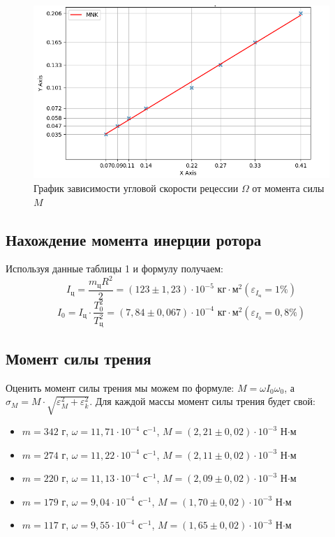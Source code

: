 \documentclass[a4paper]{article}
\begin{document}
\begin{figure}[h!]
    \centering
    \includegraphics[width=1\textwidth]{pick3}
    \caption{График зависимости угловой скорости рецессии $\Omega$ от момента силы $M$}
\end{figure}


\subsection{Нахождение момента инерции ротора}
Используя данные таблицы 1 и формулу \label{moment} получаем:
\[I_{\text{ц}} = \frac{m_{\text{ц}}R^2}{2} = (123 \pm 1,23) \cdot 10^{-5} \text{ кг}\cdot\text{м}^2 (\varepsilon_{I_{\text{ц}}} = 1\%)\]
\[I_{0} = I_{\text{ц}} \cdot \frac{T_{0}^2}{T_{\text{ц}}^2} = (7,84 \pm 0,067) \cdot 10^{-4} \text{ кг}\cdot\text{м}^2 (\varepsilon_{I_{0}} = 0,8\%)\]
\subsection{Момент силы трения}
	
	Оценить момент силы трения мы можем по формуле: $M = \omega I_0 \omega_0$, а $\sigma_M = M\cdot\sqrt{\varepsilon_M^2+ \varepsilon_k^2}$. Для каждой массы момент силы трения будет свой:
	
	\begin{itemize}
		\item $m = 342$ г, $\omega = 11,71\cdot 10^{-4}$ $\text{с}^{-1}$, $M = (2,21\pm0,02)\cdot10^{-3}$ Н$\cdot$м
		\item $m = 274$ г, $\omega = 11,22\cdot 10^{-4}$ $\text{с}^{-1}$, $M = (2,11\pm0,02)\cdot10^{-3}$ Н$\cdot$м
		\item $m = 220$ г, $\omega = 11,13\cdot 10^{-4}$ $\text{с}^{-1}$, $M = (2,09\pm0,02)\cdot10^{-3}$ Н$\cdot$м
		\item $m = 179$ г, $\omega = 9,04\cdot 10^{-4}$ $\text{с}^{-1}$, $M = (1,70\pm 0,02)\cdot10^{-3}$ Н$\cdot$м
		\item $m = 117$ г, $\omega = 9,55\cdot 10^{-4}$ $\text{с}^{-1}$, $M = (1,65 \pm 0,02)\cdot10^{-3}$ Н$\cdot$м
	\end{itemize} 
\end{document}
